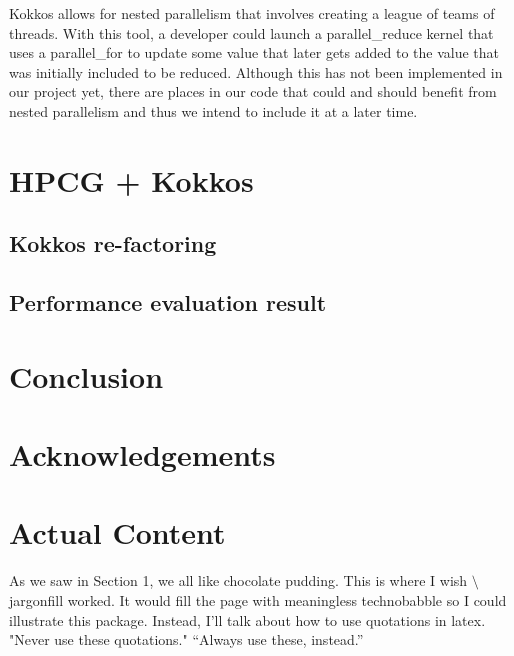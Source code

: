 \documentclass{ccr15}
\begin{document}
Kokkos allows for nested parallelism that involves creating a league of teams of threads.
With this tool, a developer could launch a parallel\_reduce kernel that uses a parallel\_for to
update some value that later gets added to the value that was initially included to be reduced.
Although this has not been implemented in our project yet, there are places in our code that
could and should benefit from nested parallelism and thus we intend to include it at a later
time.

\section{HPCG + Kokkos}
  
\subsection{Kokkos re-factoring}

\subsection{Performance evaluation result}


\section{Conclusion}

\section{Acknowledgements}

\section{Actual Content}

As we saw in Section 1, we all like chocolate pudding. This is where I wish
\textsf{$\setminus$jargonfill} worked. It would fill the page with meaningless technobabble so I could illustrate this
package. Instead, I'll talk about how to use quotations in latex. "Never use these quotations." ``Always use these,
instead.''
\end{document}

